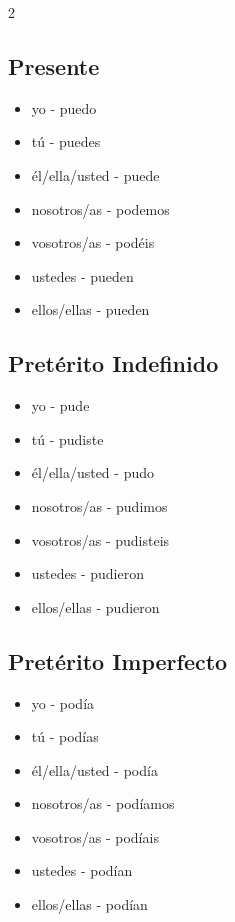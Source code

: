 \documentclass[12pt,a4paper]{article}
\begin{document}
\begin{multicols}{2}

\subsection*{Presente}
\begin{itemize}[leftmargin=*]
    \item yo - puedo
    \item tú - puedes
    \item él/ella/usted - puede
    \item nosotros/as - podemos
    \item vosotros/as - podéis
    \item ustedes - pueden
    \item ellos/ellas - pueden
\end{itemize}

\subsection*{Pretérito Indefinido}
\begin{itemize}[leftmargin=*]
    \item yo - pude
    \item tú - pudiste
    \item él/ella/usted - pudo
    \item nosotros/as - pudimos
    \item vosotros/as - pudisteis
    \item ustedes - pudieron
    \item ellos/ellas - pudieron
\end{itemize}

\subsection*{Pretérito Imperfecto}
\begin{itemize}[leftmargin=*]
    \item yo - podía
    \item tú - podías
    \item él/ella/usted - podía
    \item nosotros/as - podíamos
    \item vosotros/as - podíais
    \item ustedes - podían
    \item ellos/ellas - podían
\end{itemize}


\end{multicols}
\end{document}
